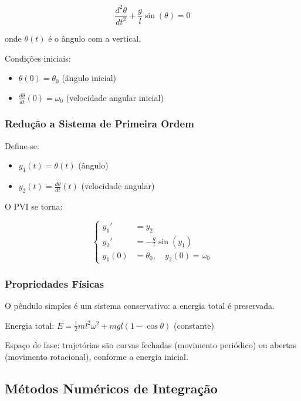 \documentclass[12pt,a4paper]{article}
\begin{document}
\begin{equation}
\frac{d^2\theta}{dt^2} + \frac{g}{l}\sin(\theta) = 0
\end{equation}

onde $\theta(t)$ é o ângulo com a vertical.

Condições iniciais:
\begin{itemize}
    \item $\theta(0) = \theta_0$ (ângulo inicial)
    \item $\frac{d\theta}{dt}(0) = \omega_0$ (velocidade angular inicial)
\end{itemize}

\subsubsection{Redução a Sistema de Primeira Ordem}

Define-se:
\begin{itemize}
    \item $y_1(t) = \theta(t)$ (ângulo)
    \item $y_2(t) = \frac{d\theta}{dt}(t)$ (velocidade angular)
\end{itemize}

O PVI se torna:

\begin{equation}
\left\{\begin{aligned}
y_1' &= y_2 \\
y_2' &= -\frac{g}{l}\sin(y_1) \\
y_1(0) &= \theta_0, \quad y_2(0) = \omega_0
\end{aligned}\right.
\end{equation}

\subsubsection{Propriedades Físicas}

O pêndulo simples é um sistema conservativo: a energia total é preservada.

Energia total: $E = \frac{1}{2}ml^2\omega^2 + mgl(1 - \cos\theta)$ (constante)

Espaço de fase: trajetórias são curvas fechadas (movimento periódico) ou abertas (movimento rotacional), conforme a energia inicial.

\subsection{Métodos Numéricos de Integração}
\end{document}
